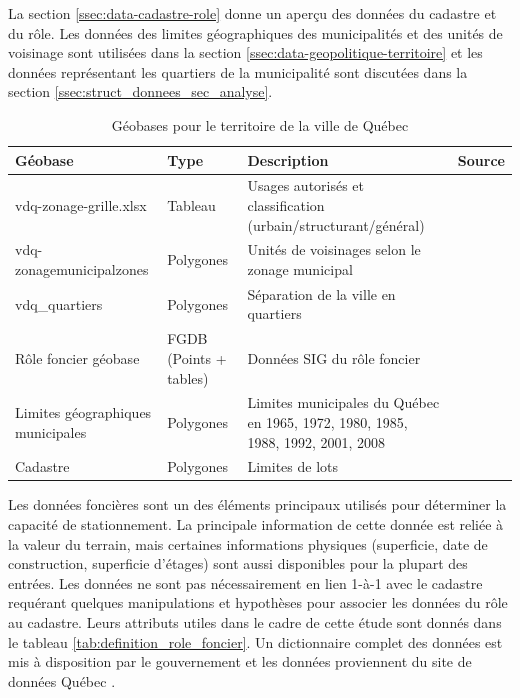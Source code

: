         La section \ref{ssec:data-cadastre-role} donne un aperçu des données du cadastre et du rôle. Les données des limites géographiques des municipalités et des unités de voisinage sont utilisées dans la section \ref{ssec:data-geopolitique-territoire} et les données représentant les quartiers de la municipalité sont discutées dans la section \ref{ssec:struct_donnees_sec_analyse}.
        \begin{landscape}
            \begin{table}[!ht]
            \caption{Géobases pour le territoire de la ville de Québec}
            \label{tab:donnees_disponibles_quebec}
            \centering
            \begin{tabular}{p{.2 \linewidth} p{.1 \linewidth} p{.3 \linewidth} p{.15\linewidth} }
                \hline
                Géobase & Type & Description  & Source \\ 
                \hline
                vdq-zonage-grille.xlsx          & Tableau        & Usages autorisés et classification (urbain/structurant/général) & \parencite{ville_de_quebec_grille_2024}\\
                \hline
                vdq-zonagemunicipalzones          & Polygones        & Unités de voisinages selon le zonage municipal & \parencite{ville_de_quebec_zonage_2024} \\
                \hline
                vdq\_quartiers & Polygones &Séparation de la ville en quartiers & \parencite{ville_de_quebec_quartiers_2024} \\
                \hline
                Rôle foncier géobase & FGDB (Points + tables) & Données SIG du rôle foncier & \parencite{gouvernement_du_quebec_rodevaluation_2024}\\
                \hline
                Limites géographiques municipales  & Polygones & Limites municipales du Québec en 1965, 1972, 1980, 1985, 1988, 1992, 2001, 2008 & \parencite{elections_quebec_atlas_2021}\\\hline
                Cadastre & Polygones & Limites de lots &  \parencite{ministere_des_ressources_naturelles_et_des_forets_polygones_2023}\\
                \hline
            \end{tabular}
            \end{table}
        \end{landscape}
        Les données foncières sont un des éléments principaux utilisés pour déterminer la capacité de stationnement. La principale information de cette donnée est reliée à la valeur du terrain, mais certaines informations physiques (superficie, date de construction, superficie d'étages) sont aussi disponibles pour la plupart des entrées. Les données ne sont pas nécessairement en lien 1-à-1 avec le cadastre requérant quelques manipulations et hypothèses pour associer les données du rôle au cadastre. Leurs attributs utiles dans le cadre de cette étude sont donnés dans le tableau \ref{tab:definition_role_foncier}. Un dictionnaire complet des données est mis à disposition par le gouvernement \parencite{gouvernement_du_quebec_rodevaluation_2024} et les données proviennent du site de données Québec \parencite{gouvernement_du_quebec_donnees_2022}. 
